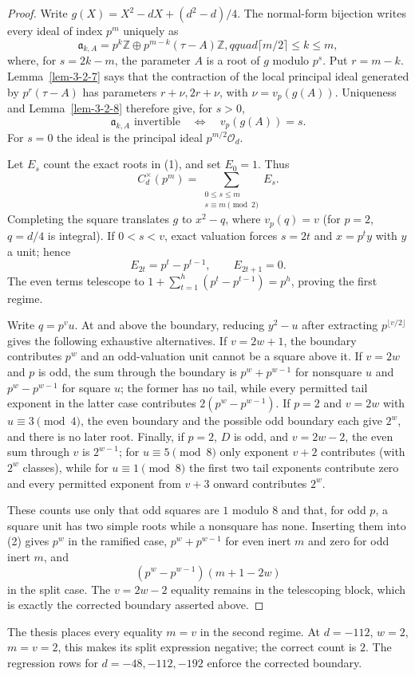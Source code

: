 \begin{proof}
Write
$g(X)=X^2-dX+(d^2-d)/4$.  The normal-form bijection writes every ideal of
index $p^m$ uniquely as
\[
\mathfrak a_{k,A}=p^k\mathbb Z\oplus
p^{m-k}(\tau-A)\mathbb Z,qquad
\lceil m/2\rceil\leq k\leq m,
\]
where, for $s=2k-m$, the parameter $A$ is a root of $g$ modulo $p^s$.
Put $r=m-k$.  Lemma~\ref{lem-3-2-7} says that the contraction of the local
principal ideal generated by $p^r(\tau-A)$ has parameters
$r+\nu,2r+\nu$, with $\nu=v_p(g(A))$.  Uniqueness and
Lemma~\ref{lem-3-2-8} therefore give, for $s>0$,
\[
\mathfrak a_{k,A}\text{ invertible}\quad\Longleftrightarrow\quad
v_p(g(A))=s.
\tag{1}
\]
For $s=0$ the ideal is the principal ideal $p^{m/2}\mathcal O_d$.

Let $E_s$ count the exact roots in (1), and set $E_0=1$.  Thus
\[
C_d^\times(p^m)=
\sum_{\substack{0\leq s\leq m\\s\equiv m\pmod2}}E_s.\tag{2}
\]
Completing the square translates $g$ to $x^2-q$, where $v_p(q)=v$ (for
$p=2$, $q=d/4$ is integral).  If $0<s<v$, exact valuation forces
$s=2t$ and $x=p^ty$ with $y$ a unit; hence
\[
E_{2t}=p^t-p^{t-1},\qquad E_{2t+1}=0.
\tag{3}
\]
The even terms telescope to
$1+\sum_{t=1}^h(p^t-p^{t-1})=p^h$, proving the first regime.

Write $q=p^vu$.  At and above the boundary, reducing $y^2-u$ after extracting
$p^{\lfloor v/2\rfloor}$ gives the following exhaustive alternatives.
If $v=2w+1$, the boundary contributes $p^w$ and an odd-valuation unit cannot
be a square above it.  If $v=2w$ and $p$ is odd, the sum through the boundary
is $p^w+p^{w-1}$ for nonsquare $u$ and $p^w-p^{w-1}$ for square $u$; the
former has no tail, while every permitted tail exponent in the latter case
contributes $2(p^w-p^{w-1})$.  If $p=2$ and $v=2w$ with
$u\equiv3\pmod4$, the even boundary and the possible odd boundary each give
$2^w$, and there is no later root.  Finally, if $p=2$, $D$ is odd, and
$v=2w-2$, the even sum through $v$ is $2^{w-1}$; for
$u\equiv5\pmod8$ only exponent $v+2$ contributes (with $2^w$ classes), while
for $u\equiv1\pmod8$ the first two tail exponents contribute zero and every
permitted exponent from $v+3$ onward contributes $2^w$.

These counts use only that odd squares are $1$ modulo $8$ and that, for odd
$p$, a square unit has two simple roots while a nonsquare has none.  Inserting
them into (2) gives $p^w$ in the ramified case,
$p^w+p^{w-1}$ for even inert $m$ and zero for odd inert $m$, and
\[
(p^w-p^{w-1})(m+1-2w)
\]
in the split case.  The $v=2w-2$ equality remains in the telescoping block,
which is exactly the corrected boundary asserted above.
\end{proof}

\begin{remark}\label{cor-3-1-3-errata}
The thesis places every equality $m=v$ in the second regime.  At
$d=-112$, $w=2$, $m=v=2$, this makes its split expression negative; the
correct count is $2$.  The regression rows for $d=-48,-112,-192$ enforce the
corrected boundary.
\end{remark}
